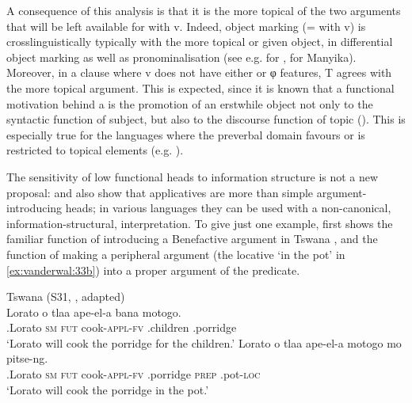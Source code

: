 \documentclass[output=paper]{LSP/langsci}
\begin{document}
A consequence of this analysis is that it is the more topical of the two arguments that will be left available for  with v. Indeed, object marking (=  with v) is crosslinguistically typically with the more topical or given object, in differential object marking as well as pronominalisation (see e.g. \citealt{Adams2010,Zeller2014,Zeller2015} for , \citealt{BaxDiercks2012} for Manyika). Moreover, in a  clause where v does not have either  or φ features, T agrees with the more topical argument. This is expected, since it is known that a functional motivation behind a  is the promotion of an erstwhile object not only to the syntactic function of subject, but also to the discourse function of topic (\citealt[9]{Givón1994}). This is especially true for the  languages where the preverbal domain favours or is restricted to topical elements (e.g. \citealt{Morimoto2006,Henderson2006,Zeller2008,Zerbian2006,VanderWal2009,Yoneda2011}).

\largerpage
The sensitivity of low functional heads to information structure is not a new proposal: \citet{Creissels2004,Marten2003,CannMabugu2007}  and \citet{deKindEtAl2012} also show that applicatives are more than simple argument-introducing heads; in various  languages they can be used with a non-canonical, information-structural, interpretation. To give just one example, \citet{Creissels2004} first shows the familiar function of introducing a Benefactive argument in Tswana , and the function of making a peripheral argument (the locative ‘in the pot’ in \ref{ex:vanderwal:33b}) into a proper argument of the predicate.


\ea\label{ex:vanderwal:33}%
Tswana (S31, \citealt[13]{Creissels2004}, adapted)\\
\ea\label{ex:vanderwal:33a}
\gll Lorato  o  tlaa  ape-el-a  bana  motogo.\\
    .Lorato  \textsc{sm}  \textsc{fut}  cook-\textsc{appl}{}-\textsc{fv}  .children  .porridge\\
    \glt ‘Lorato will cook the porridge for the children.’
\ex\label{ex:vanderwal:33b}
\gll Lorato  o  tlaa  ape-el-a  motogo  mo  pitse-ng.\\
    .Lorato  \textsc{sm}  \textsc{fut}  cook-\textsc{appl}{}-\textsc{fv}  .porridge  \textsc{prep}  .pot-\textsc{loc}\\
    \glt ‘Lorato will cook the porridge in the pot.’
\z
\z
\end{document}
